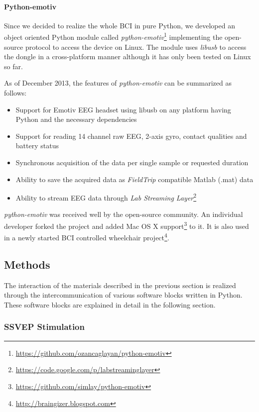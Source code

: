 \documentclass[12pt]{article}
\newcommand\mysubsection[1]{\subsection{#1}}
\newcommand\mysubsubsection[1]{\subsubsection{#1}}
\newcommand\mysubsubsubsection[1]{\paragraph{#1}\hspace{0pt}}
\numberwithin{equation}{section}
\numberwithin{figure}{section}
\numberwithin{table}{section}
\begin{document}
\mysubsubsubsection{Python-emotiv}
\par{
    Since we decided to realize the whole BCI in pure Python, we developed an object oriented
    Python module called \emph{python-emotiv}\footnote{\url{https://github.com/ozancaglayan/python-emotiv}}
    implementing the open-source protocol to access the device on Linux. The module uses \emph{libusb}
    to access the dongle in a cross-platform manner although it has only been tested on Linux
    so far.
}
\par{
    As of December 2013, the features of \emph{python-emotiv} can be summarized as follows:
    \begin{itemize}
        \item Support for Emotiv EEG headset using libusb on any platform having Python and the necessary dependencies
        \item Support for reading 14 channel raw EEG, 2-axis gyro, contact qualities and battery status
        \item Synchronous acquisition of the data per single sample or requested duration
        \item Ability to save the acquired data as \emph{FieldTrip} \citep{oostenveld_fieldtrip:_2011} compatible Matlab (.mat) data
        \item Ability to stream EEG data through \emph{Lab Streaming Layer}\footnote{\url{https://code.google.com/p/labstreaminglayer}}
    \end{itemize}
}
\par{
    \emph{python-emotiv} was received well by the open-source community. An individual developer
    forked the project and added Mac OS X support\footnote{\url{https://github.com/simlay/python-emotiv}} to it.
    It is also used in a newly started BCI controlled wheelchair project\footnote{\url{http://braingizer.blogspot.com}}.
}

\mysubsection{Methods}
\par{
    The interaction of the materials described in the previous section
    is realized through the intercommunication of various software blocks
    written in Python. These software blocks are explained in detail
    in the following section.
}

\mysubsubsection{SSVEP Stimulation}
\end{document}
